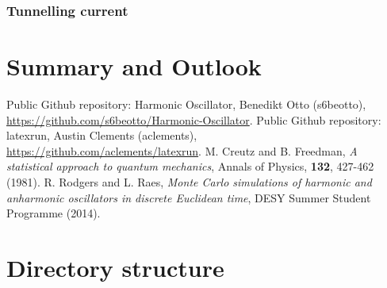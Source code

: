 \documentclass{scrartcl}
\begin{document}
	\subsubsection{Tunnelling current}
	\section{Summary and Outlook}
	\newpage
	\begin{thebibliography}{widestlabel}
		 Public Github repository: Harmonic Oscillator, Benedikt Otto (s6beotto), \\\url{https://github.com/s6beotto/Harmonic-Oscillator}.
		 Public Github repository: latexrun, Austin Clements (aclements), \\\url{https://github.com/aclements/latexrun}.
		 M. Creutz and B. Freedman, \textit{A statistical approach to quantum mechanics}, Annals of Physics, \textbf{132}, 427-462 (1981).
		 R. Rodgers and L. Raes, \textit{Monte Carlo simulations of harmonic and anharmonic oscillators in discrete Euclidean time}, DESY Summer Student Programme (2014).
	\end{thebibliography}
	\appendix
	\section{Directory structure}
\end{document}
